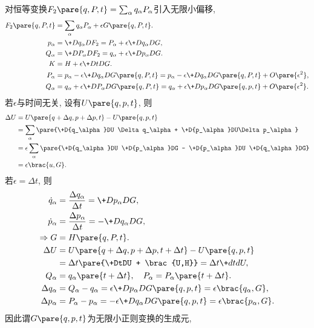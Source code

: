 \documentclass{ctexart}
\begin{document}
对恒等变换$F_2\pare{q,P,t} = \sum_\alpha q_\alpha P_\alpha$引入无限小偏移,
\begin{align*}
    F_2\pare{q,P,t} &= \sum_\alpha q_\alpha P_\alpha + \epsilon G\pare{q,P,t}. \\
    p_\alpha &= \+D{q_\alpha}D{F_2} = P_\alpha + \epsilon \+D{q_\alpha}DG, \\
    Q_\alpha &= \+D{P_\alpha}D{F_2} = q_\alpha + \epsilon \+D{p_\alpha}DG. \\
    K &= H + \epsilon \+DtDG. \\
    P_\alpha &= p_\alpha - \epsilon \+D{q_\alpha}D{G\pare{q,P,t}} = p_\alpha - \epsilon \+D{q_\alpha}D{G\pare{q,P,t}} + O\pare{\epsilon^2}, \\
    Q_\alpha &= q_\alpha + \epsilon \+D{P_\alpha}D{G\pare{q,P,t}} = q_\alpha + \epsilon \+D{p_\alpha}D{G\pare{q,p,t}} + O\pare{\epsilon^2}.
\end{align*}
若$\epsilon$与时间无关, 设有$U\pare{q,p,t}$, 则
\begin{align*}
    \Delta U &= U\pare{q+\Delta q,p+\Delta p, t} - U\pare{q,p,t} \\
    &= \sum_\alpha \pare{\+D{q_\alpha}DU \Delta q_\alpha + \+D{p_\alpha}DU\Delta p_\alpha} \\
    &= \epsilon \sum_\alpha \pare{\+D{q_\alpha}DU \+D{p_\alpha}DG - \+D{p_\alpha}DU \+D{q_\alpha}DG} \\
    &= \epsilon\brac{u,G}.
\end{align*}
若$\epsilon = \Delta t$, 则
\begin{align*}
    \dot{q}_\alpha &= \frac{\Delta q_\alpha}{\Delta t} = \+D{p_\alpha}DG, \\
    \dot{p}_\alpha &= \frac{\Delta p_\alpha}{\Delta t} = -\+D{q_\alpha}DG, \\
    \Rightarrow G &= H\pare{q,P,t}. \\
    \Delta U &= U\pare{q+\Delta q, p+\Delta p, t+\Delta t} - U\pare{q,p,t} \\
    &= \Delta t \pare{\+DtDU + \brac{U,H}} = \Delta t \+dtdU, \\
    Q_\alpha &= q_\alpha\pare{t+\Delta t}, \quad P_\alpha = P_\alpha\pare{t+\Delta t}. \\
    \Delta q_\alpha &= Q_\alpha - q_\alpha = \epsilon \+D{p_\alpha}D{G\pare{q,p,t}} = \epsilon \brac{q_\alpha,G}, \\
    \Delta p_\alpha &= P_\alpha - p_\alpha = -\epsilon \+D{q_\alpha}D{G\pare{q,p,t}} = \epsilon\brac{p_\alpha,G}.
\end{align*}
因此谓$G\pare{q,p,t}$为无限小正则变换的生成元,
\end{document}
